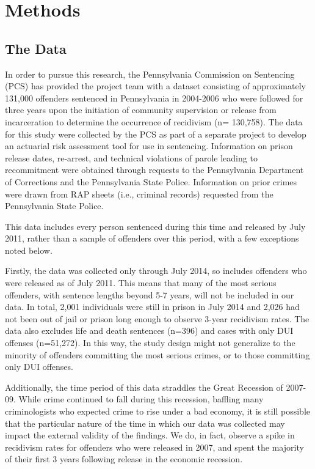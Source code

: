 \documentclass{article}
\begin{document}
\section{Methods}

\subsection{The Data}
In order to pursue this research, the Pennsylvania Commission on Sentencing (PCS) has provided the project team with a dataset consisting of approximately 131,000 offenders sentenced in Pennsylvania in 2004-2006 who were followed for three years upon the initiation of community supervision or release from incarceration to determine the occurrence of recidivism (n= 130,758). The data for this study were collected by the PCS as part of a separate project to develop an actuarial risk assessment tool for use in sentencing. Information on prison release dates, re-arrest, and technical violations of parole leading to recommitment were obtained through requests to the Pennsylvania Department of Corrections and the Pennsylvania State Police. Information on prior crimes were drawn from RAP sheets (i.e., criminal records) requested from the Pennsylvania State Police. 

This data includes every person sentenced during this time and released by July 2011, rather than a sample of offenders over this period, with a few exceptions noted below. 

Firstly, the data was collected only through July 2014, so includes offenders who were released as of July 2011. This means that many of the most serious offenders, with sentence lengths beyond 5-7 years, will not be included in our data. In total, 2,001 individuals were still in prison in July 2014 and 2,026 had not been out of jail or prison long enough to observe 3-year recidivism rates. The data also excludes life and death sentences (n=396) and cases with only DUI offenses (n=51,272). In this way, the study design might not generalize to the minority of offenders committing the most serious crimes, or to those committing only DUI offenses.

Additionally, the time period of this data straddles the Great Recession of 2007-09. While crime continued to fall during this recession, baffling many criminologists who expected crime to rise under a bad economy, it is still possible that the particular nature of the time in which our data was collected may impact the external validity of the findings.\cite{freak} We do, in fact, observe a spike in recidivism rates for offenders who were released in 2007, and spent the majority of their first 3 years following release in the economic recession.
\end{document}
